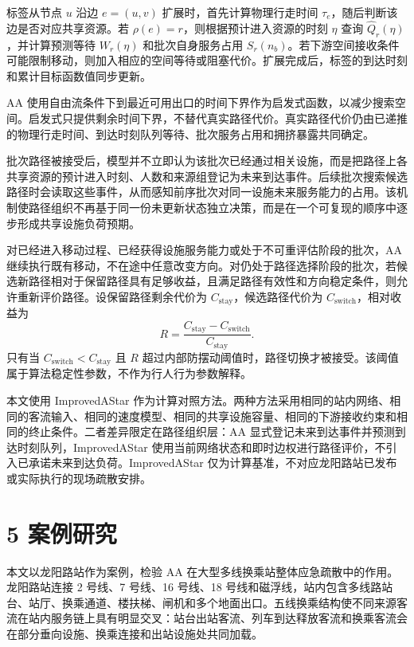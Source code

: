 \documentclass[UTF8,a4paper,12pt]{ctexart}
\begin{document}
标签从节点 \(u\) 沿边 \(e=(u,v)\) 扩展时，首先计算物理行走时间 \(\tau_e\)，随后判断该边是否对应共享资源。若 \(\rho(e)=r\)，则根据预计进入资源的时刻 \(\eta\) 查询 \(\widehat Q_r(\eta)\)，并计算预测等待 \(W_r(\eta)\) 和批次自身服务占用 \(S_r(n_b)\)。若下游空间接收条件可能限制移动，则加入相应的空间等待或阻塞代价。扩展完成后，标签的到达时刻和累计目标函数值同步更新。

AA 使用自由流条件下到最近可用出口的时间下界作为启发式函数，以减少搜索空间。启发式只提供剩余时间下界，不替代真实路径代价。真实路径代价仍由已递推的物理行走时间、到达时刻队列等待、批次服务占用和拥挤暴露共同确定。

批次路径被接受后，模型并不立即认为该批次已经通过相关设施，而是把路径上各共享资源的预计进入时刻、人数和来源组登记为未来到达事件。后续批次搜索候选路径时会读取这些事件，从而感知前序批次对同一设施未来服务能力的占用。该机制使路径组织不再基于同一份未更新状态独立决策，而是在一个可复现的顺序中逐步形成共享设施负荷预期。

对已经进入移动过程、已经获得设施服务能力或处于不可重评估阶段的批次，AA 继续执行既有移动，不在途中任意改变方向。对仍处于路径选择阶段的批次，若候选新路径相对于保留路径具有足够收益，且满足路径有效性和方向稳定条件，则允许重新评价路径。设保留路径剩余代价为 \(C_{\mathrm{stay}}\)，候选路径代价为 \(C_{\mathrm{switch}}\)，相对收益为
\[
R=\frac{C_{\mathrm{stay}}-C_{\mathrm{switch}}}{C_{\mathrm{stay}}}.
\]
只有当 \(C_{\mathrm{switch}}<C_{\mathrm{stay}}\) 且 \(R\) 超过内部防摆动阈值时，路径切换才被接受。该阈值属于算法稳定性参数，不作为行人行为参数解释。

本文使用 ImprovedAStar 作为计算对照方法。两种方法采用相同的站内网络、相同的客流输入、相同的速度模型、相同的共享设施容量、相同的下游接收约束和相同的终止条件。二者差异限定在路径组织层：AA 显式登记未来到达事件并预测到达时刻队列，ImprovedAStar 使用当前网络状态和即时边权进行路径评价，不引入已承诺未来到达负荷。ImprovedAStar 仅为计算基准，不对应龙阳路站已发布或实际执行的现场疏散安排。

\section{5 案例研究}

本文以龙阳路站作为案例，检验 AA 在大型多线换乘站整体应急疏散中的作用。龙阳路站连接 2 号线、7 号线、16 号线、18 号线和磁浮线，站内包含多线路站台、站厅、换乘通道、楼扶梯、闸机和多个地面出口。五线换乘结构使不同来源客流在站内服务链上具有明显交叉：站台出站客流、列车到达释放客流和换乘客流会在部分垂向设施、换乘连接和出站设施处共同加载。
\end{document}
